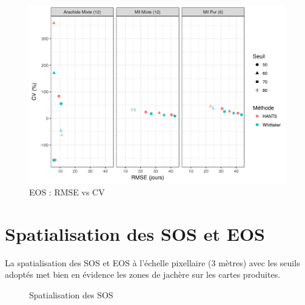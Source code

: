 \begin{figure}[htbp]
 \begin{center}
  \includegraphics[scale=0.8]{annexes/EOS_RMSE_vs_CV_Oracle.png} 
 \end{center}
 \caption*{EOS : RMSE vs CV}
\end{figure}

\chapter{Spatialisation des SOS et EOS}\label{annexe-d}

La spatialisation des SOS et EOS à l’échelle pixellaire (3 mètres) avec les seuils
adoptés met bien en évidence les zones de jachère sur les cartes produites.

\vspace{8mm}

\begin{figure}[htbp]
 \begin{center}
 \end{center}
 \caption*{Spatialisation des SOS}
\end{figure}

